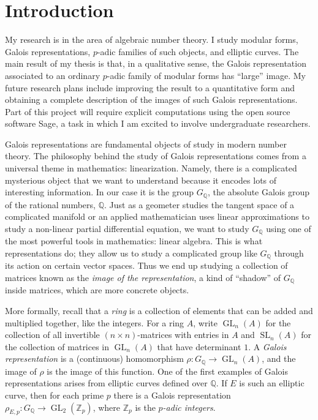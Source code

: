 \documentclass[12pt]{article}
\newcommand{\Q}{\mathbb{Q}}
\newcommand{\Z}{\mathbb{Z}}
\theoremstyle{definition}
\DeclareMathOperator{\GL}{GL}
\DeclareMathOperator{\SL}{SL}
\begin{document}
\section*{Introduction}
My research is in the area of algebraic number theory.  I study modular forms, Galois representations, $p$-adic families of such objects, and elliptic curves.  The main result of my thesis is that, in a qualitative sense, the Galois representation associated to an ordinary $p$-adic family of modular forms has ``large'' image.  My future research plans include improving the result to a quantitative form and obtaining a complete description of the images of such Galois representations.  Part of this project will require explicit computations using the open source software Sage, a task in which I am excited to involve undergraduate researchers.    

Galois representations are fundamental objects of study in modern number theory.  The philosophy behind the study of Galois representations comes from a universal theme in mathematics: linearization. Namely, there is a complicated mysterious object that we want to understand because it encodes lots of interesting information.  In our case it is the group $G_\Q$, the absolute Galois group of the rational numbers, $\Q$.  Just as a geometer studies the tangent space of a complicated manifold or an applied mathematician uses linear approximations to study a non-linear partial differential equation, we want to study $G_\Q$ using one of the most powerful tools in mathematics: linear algebra.  This is what representations do; they allow us to study a complicated group like $G_\Q$ through its action on certain vector spaces.  Thus we end up studying a collection of matrices known as the \textit{image of the representation}, a kind of ``shadow'' of $G_\Q$ inside matrices, which are more concrete objects.  

More formally, recall that a \textit{ring} is a collection of elements that can be added and multiplied together, like the integers.  For a ring $A$, write $\GL_n(A)$ for the collection of all invertible $(n \times n)$-matrices with entries in $A$ and $\SL_n(A)$ for the collection of matrices in $\GL_n(A)$ that have determinant $1$.  A \textit{Galois representation} is a (continuous) homomorphism $\rho : G_\Q \to \GL_n(A)$, and the image of $\rho$ is the image of this function.  One of the first examples of Galois representations arises from elliptic curves defined over $\Q$.  If $E$ is such an elliptic curve, then for each prime $p$ there is a Galois representation $\rho_{E, p} : G_\Q \to \GL_2(\Z_p)$, where $\Z_p$ is the \textit{$p$-adic integers}.   
\end{document}
